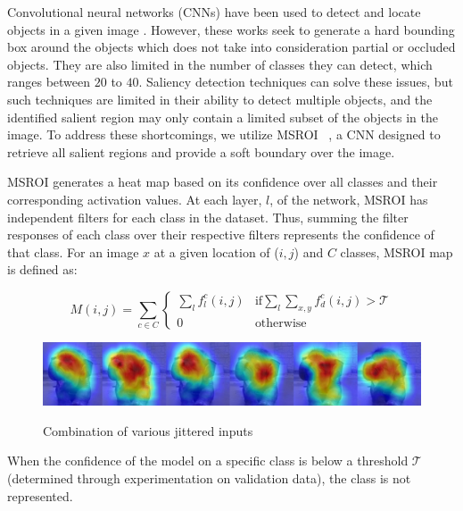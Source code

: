 Convolutional neural networks (CNNs) have been used to detect and locate objects in a given image \cite{Erhan2014ScalableOD,Zhao_2015_CVPR}. 
However, these works seek to generate a hard bounding box around the objects which does not take into consideration partial or occluded objects.
They are also limited in the number of classes they can detect, which ranges between $20$ to $40$.
Saliency detection techniques can solve these issues, but such techniques are limited in their ability to detect multiple objects, and the identified salient region may only contain a limited subset of the objects in the image.
To address these shortcomings, we utilize MSROI  ~\cite{Prakash2017SemanticPI}, a CNN designed to retrieve all salient regions and provide a soft boundary over the image.

MSROI generates a heat map based on its confidence over all classes and their corresponding activation values. 
At each layer, $l$, of the network, MSROI has independent filters for each class in the dataset. 
Thus, summing the filter responses of each class over their respective filters represents the confidence of that class. 
For an image $x$ at a given location of ($i,j$) and $C$ classes, MSROI map is defined as:

\[
M(i,j) = \sum_{c \in C} \begin{cases}
                        \sum_l f_l^c(i,j) & \text{if} \sum_{l} \sum_{x,y} f_d^c(i,j) > \mathcal{T} \\
                        0 & \text{otherwise}
                        \end{cases}
\]

\begin{figure}[H]
\includegraphics[scale=0.4]{figures/protect/out2_small_small.png}
     \label{fig:combination}
          \caption[Combination of various jittered inputs]{Combination of various jittered inputs}
 \end{figure}


When the confidence of the model on a specific class is below a threshold $\mathcal{T}$ (determined through experimentation on validation data), the class is not represented. 

